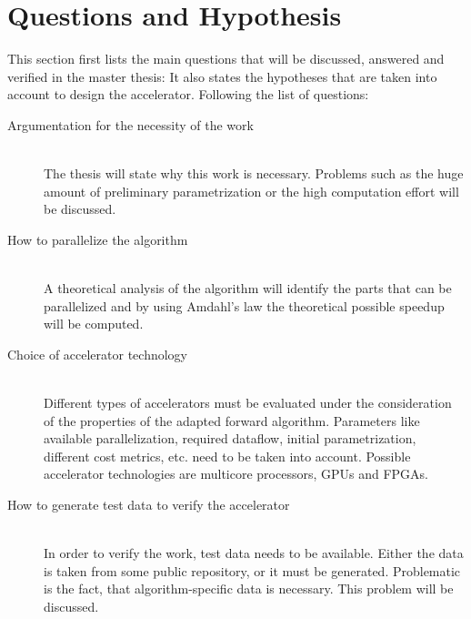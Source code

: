\documentclass[12pt]{article} %
\begin{document}

\section{Questions and Hypothesis} %

This section first lists the main questions that will be discussed, answered and
verified in the master thesis:
It also states the hypotheses that are taken into
account to design the accelerator. Following the list of questions:
\begin{description}
    \item[Argumentation for the necessity of the work] \hfill \\
        The thesis will state why this work is necessary. Problems such as the
        huge amount of preliminary parametrization or the high computation
        effort will be discussed.
    \item[How to parallelize the algorithm] \hfill \\
        A theoretical analysis of the algorithm will identify the parts that can
        be parallelized and by using Amdahl's law the theoretical possible
        speedup will be computed.
    \item[Choice of accelerator technology] \hfill \\
        Different types of accelerators must be evaluated under the
        consideration of the properties of the adapted forward algorithm.
        Parameters like available parallelization, required dataflow, initial
        parametrization, different cost metrics, etc. need to be taken into
        account. Possible accelerator technologies are multicore processors,
        GPUs and FPGAs.
    \item[How to generate test data to verify the accelerator] \hfill \\
        In order to verify the work, test data needs to be available. Either the
        data is taken from some public repository, or it must be generated.
        Problematic is the fact, that algorithm-specific data is necessary. This
        problem will be discussed.
\end{description}
\end{document}
